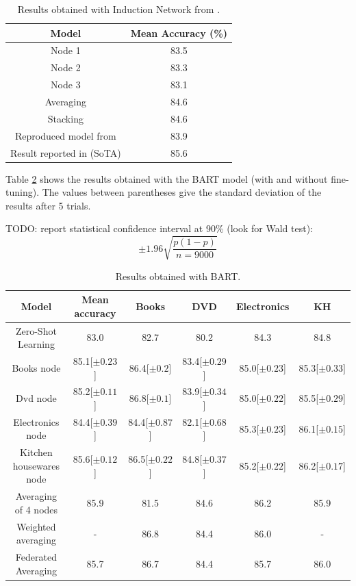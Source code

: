 \documentclass{esannV2}
\begin{document}
        \begin{table}[h!]
      \centering
      \begin{tabular}{|c|c|}
        \hline
        Model & Mean Accuracy (\%) \\
        \hline
        Node 1 & 83.5 \\
        Node 2 & 83.3 \\
        Node 3 & 83.1 \\
        Averaging & 84.6 \\
        Stacking & 84.6 \\
        Reproduced model from \cite{geng2019induction} & 83.9 \\
        Result reported in \cite{geng2019induction} (SoTA) & 85.6 \\
        \hline
      \end{tabular}
      \caption{Results obtained with Induction Network from \cite{geng2019induction}.}\label{Tab:induction_results}
    \end{table}
    
    Table \ref{Tab:bart_results} shows the results obtained with the BART model (with and without fine-tuning). The values between parentheses give the standard deviation of the results after 5 trials.
    
    TODO: report statistical confidence interval at 90\% (look for Wald test):
    $$\pm 1.96 \sqrt{\frac {p(1-p)}{n=9000}}$$
    

    \begin{table}[h!]
      \centering
      \hspace*{-40pt}\begin{tabular}{|c|c|c|c|c|c|}
        \hline
        Model & Mean accuracy & Books & DVD & Electronics & KH \\
        \hline
        Zero-Shot Learning & 83.0 & 82.7 & 80.2 & 84.3 & 84.8 \\
        Books node & 85.1[$\pm 0.23$] & 86.4[$\pm 0.2$] & 83.4[$\pm 0.29$] & 85.0[$\pm 0.23$] & 85.3[$\pm 0.33]$ \\
        Dvd node & 85.2[$\pm 0.11$] & 86.8[$\pm 0.1$] & 83.9[$\pm 0.34$] & 85.0[$\pm 0.22$] & 85.5[$\pm 0.29$]  \\
        Electronics node & 84.4[$\pm 0.39$] & 84.4[$\pm 0.87$] & 82.1[$\pm 0.68$] & 85.3[$\pm 0.23$] & 86.1[$\pm 0.15$] \\
        Kitchen housewares node & 85.6[$\pm 0.12$] & 86.5[$\pm 0.22$] & 84.8[$\pm 0.37$] & 85.2[$\pm 0.22$] & 86.2[$\pm 0.17$]  \\
        Averaging of 4 nodes & 85.9 & 81.5 & 84.6 & 86.2 & 85.9  \\
        Weighted averaging & - & 86.8 & 84.4 & 86.0 & -  \\
        Federated Averaging & 85.7 & 86.7 & 84.4 & 85.7 & 86.0  \\
        \hline
      \end{tabular}
      \caption{Results obtained with BART.}\label{Tab:bart_results}
    \end{table}
    
\end{document}
